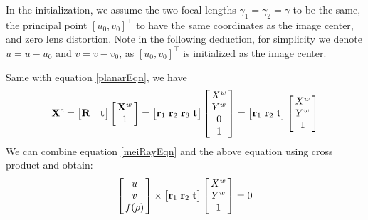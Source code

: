 \documentclass{report}
\begin{document}
In the initialization, we assume the two focal lengths $\gamma_1 = \gamma_2 = \gamma$ to be the same, the principal point $[u_0, v_0]^\top$ to have the same coordinates as the image center, and zero lens distortion. Note in the following deduction, for simplicity we denote $u = u - u_0$ and $v = v - v_0$, as $[u_0, v_0]^\top$ is initialized as the image center. 

Same with equation \ref{planarEqn}, we have
\begin{equation}
\mathbf{X}^c = 
\begin{bmatrix}
\mathbf{R} & \mathbf{t}
\end{bmatrix}
\arraycolsep=1.5pt%
\begin{bmatrix}
	\begin{array}{c}
	\mathbf{X}^w \\ 1
	\end{array}
\end{bmatrix}
= 
\begin{bmatrix}
\mathbf{r}_1 & \mathbf{r}_2 & \mathbf{r}_3 & \mathbf{t}
\end{bmatrix}
\arraycolsep=1.5pt%
\begin{bmatrix}
	\begin{array}{c}
	X^w \\ Y^w \\ 0 \\ 1
	\end{array}
\end{bmatrix}
= 
\begin{bmatrix}
\mathbf{r}_1 & \mathbf{r}_2 & \mathbf{t}
\end{bmatrix}
\arraycolsep=1.5pt%
\begin{bmatrix}
	\begin{array}{c}
	X^w \\ Y^w \\ 1
	\end{array}
\end{bmatrix}
\label{planarEqn}
\end{equation}
We can combine equation \ref{meiRayEqn} and the above equation using cross product and obtain: 
\begin{equation}
\arraycolsep=1.5pt%
\begin{bmatrix}
	\begin{array}{c}
	u\\ v \\ f(\rho)
	\end{array}
\end{bmatrix} 
\times
\begin{bmatrix}
\mathbf{r}_1 & \mathbf{r}_2 & \mathbf{t}
\end{bmatrix}
\arraycolsep=1.5pt%
\begin{bmatrix}
	\begin{array}{c}
	X^w \\ Y^w \\ 1
	\end{array}
\end{bmatrix}
= 0
\label{initEqn}
\end{equation}
\end{document}
